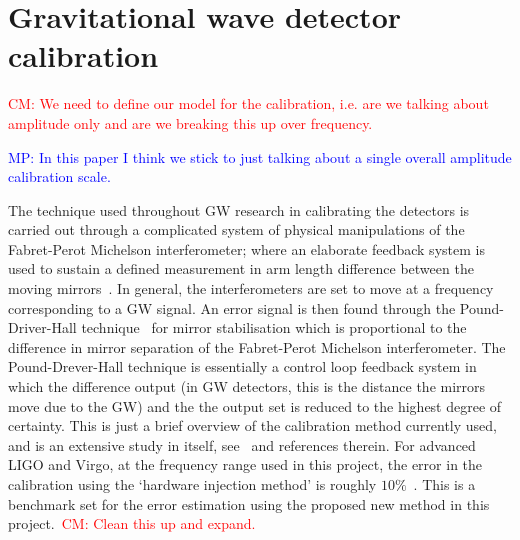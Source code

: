 \documentclass[12pt]{iopart}
\newcommand{\cm}[1]{\textcolor{red}{CM: #1}}
\newcommand{\MP}[1]{\textcolor{blue}{MP: #1}}
\begin{document}
\section{Gravitational wave detector calibration\label{sec:calibration}}

\cm{We need to define our model for the calibration, i.e. are we talking
about amplitude only and are we breaking this up over frequency.}

\MP{In this paper I think we stick to just talking about a single overall amplitude calibration scale.}

The technique used throughout GW research in calibrating the detectors is
carried out through a complicated system of physical manipulations of the
Fabret-Perot Michelson interferometer; where an elaborate feedback system is
used to sustain a defined measurement in arm length difference between the
moving mirrors~\cite{LIGOCal}. In general, the interferometers are set to move
at a frequency corresponding to a GW signal. An error signal is then found
through the Pound-Driver-Hall technique~\cite{Black} for mirror stabilisation
which is proportional to the difference in mirror separation of the
Fabret-Perot Michelson interferometer. The Pound-Drever-Hall technique is
essentially a control loop feedback system in which the difference output (in
GW detectors, this is the distance the mirrors move due to the GW) and the the
output set is reduced to the highest degree of certainty. This is just a brief
overview of the calibration method currently used, and is an extensive study in
itself, see~\cite{Vitale:2012} and references therein. For advanced LIGO and Virgo,
at the frequency range used in this project, the error in the calibration using
the `hardware injection method' is roughly $10\%$~\cite{Vitale:2012}. This is a
benchmark set for the error estimation using the proposed new method in this
project.~\cm{Clean this up and expand.}
\end{document}
